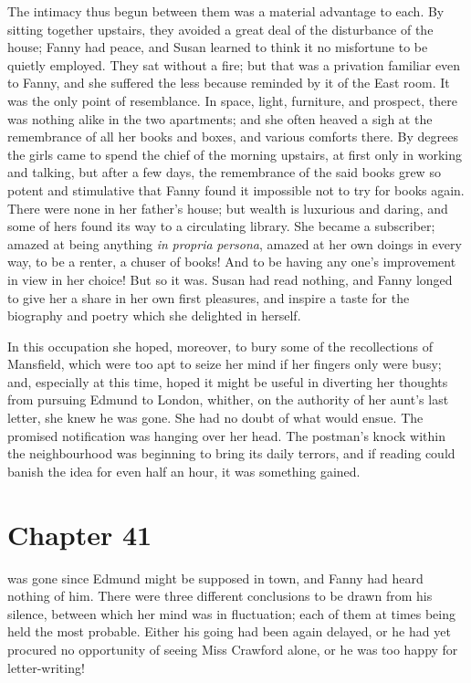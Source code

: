 The intimacy thus begun between them was a material
advantage to each.  By sitting together upstairs,
they avoided a great deal of the disturbance of the house;
Fanny had peace, and Susan learned to think it no
misfortune to be quietly employed.  They sat without
a fire; but that was a privation familiar even to Fanny,
and she suffered the less because reminded by it of
the East room.  It was the only point of resemblance.
In space, light, furniture, and prospect, there was nothing
alike in the two apartments; and she often heaved a sigh
at the remembrance of all her books and boxes, and various
comforts there.  By degrees the girls came to spend the
chief of the morning upstairs, at first only in working
and talking, but after a few days, the remembrance of the
said books grew so potent and stimulative that Fanny found
it impossible not to try for books again.  There were none
in her father's house; but wealth is luxurious and daring,
and some of hers found its way to a circulating library.
She became a subscriber; amazed at being anything \emph{in}
\emph{propria} \emph{persona}, amazed at her own doings in every way,
to be a renter, a chuser of books!  And to be having any
one's improvement in view in her choice!  But so it was.
Susan had read nothing, and Fanny longed to give her
a share in her own first pleasures, and inspire a taste
for the biography and poetry which she delighted in herself.

In this occupation she hoped, moreover, to bury some
of the recollections of Mansfield, which were too apt
to seize her mind if her fingers only were busy;
and, especially at this time, hoped it might be useful
in diverting her thoughts from pursuing Edmund to London,
whither, on the authority of her aunt's last letter,
she knew he was gone.  She had no doubt of what would ensue.
The promised notification was hanging over her head.
The postman's knock within the neighbourhood was beginning
to bring its daily terrors, and if reading could banish
the idea for even half an hour, it was something gained.



\chapter{Chapter 41}

 was gone since Edmund might be supposed
in town, and Fanny had heard nothing of him.
There were three different conclusions to be drawn from
his silence, between which her mind was in fluctuation;
each of them at times being held the most probable.
Either his going had been again delayed, or he had yet
procured no opportunity of seeing Miss Crawford alone,
or he was too happy for letter-writing!

